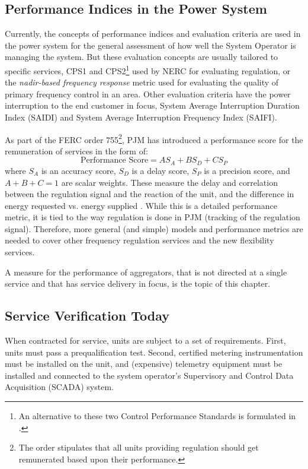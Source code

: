 \subsection{Performance Indices in the Power System}\label{subsec:perfindicesinpowsys}
Currently, the concepts of performance indices and evaluation criteria are used in the power system for the general assessment of how well the System Operator is managing the system. But these evaluation concepts are usually tailored to specific services, \eg CPS1 and CPS2\footnote{An alternative to these two Control Performance Standards is formulated in \cite{gross2001analysis}.} used by NERC for evaluating regulation, or the \emph{nadir-based frequency response} metric used for evaluating the quality of primary frequency control in an area. Other evaluation criteria have the power interruption to the end customer in focus, \eg System Average Interruption Duration Index (SAIDI) and System Average Interruption Frequency Index (SAIFI). 

As part of the FERC order 755\footnote{The order stipulates that all units providing regulation should get remunerated based upon their performance.}, PJM has introduced a performance score for the remuneration of services in the form of:
\begin{equation}
	\text{Performance Score} = A S_A + B S_D +C S_P
\end{equation}
where $S_A$ is an accuracy score, $S_D$ is a delay score, $S_P$ is a precision score, and $A+B+C =1$ are scalar weights. These measure the delay and correlation between the regulation signal and the reaction of the unit, and the difference in energy requested vs. energy supplied \cite{pjmperf}. While this is a detailed performance metric, it is tied to the way regulation is done in PJM (tracking of the regulation signal). Therefore, more general (and simple) models and performance metrics are needed to cover other frequency regulation services and the new flexibility services.


A measure for the performance of aggregators, that is not directed at a single service and that has service delivery in focus, is the topic of this chapter.
\subsection{Service Verification Today} %
\label{sub:ServiceVerificationToday}
When contracted for service, units are subject to a set of requirements. First, units must pass a prequalification test.
Second, certified metering instrumentation must be installed on the unit, and (expensive) telemetry equipment must be installed and connected to the system operator's Supervisory and Control Data Acquisition (SCADA) system.

